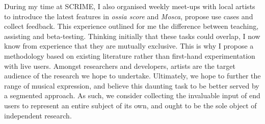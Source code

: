 \documentclass[journal,onecolumn]{IEEEtran}
\begin{document}
During my time at SCRIME, I also organised weekly meet-ups with local artists to introduce the latest features in \textit{ossia score} and \textit{Mosca}, propose use cases and collect feedback. This experience outlined for me the difference between teaching, assisting and beta-testing. Thinking initially that these tasks could overlap, I now know from experience that they are mutually exclusive. This is why I propose a methodology based on existing literature rather than first-hand experimentation with live users. Amongst researchers and developers, artists are the target audience of the research we hope to undertake. Ultimately, we hope to further the range of musical expression, and believe this daunting task to be better served by a segmented approach. As such, we consider collecting the invaluable input of end users to represent an entire subject of its own, and ought to be the sole object of independent research.
\end{document}
